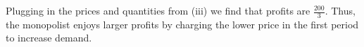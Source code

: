 \documentclass[12pt]{article}
\newcounter{question}[section]
\newenvironment{subquestions}{
  \begin{enumerate}[label=(\roman*)]}{\end{enumerate}}
\begin{document}
\begin{subquestions}
  \textcolor{solution-color}{
Plugging in the prices and quantities from (iii) we find that profits are $\frac{200}{3}$. Thus, the monopolist enjoys larger profits by charging the lower price in the first period to increase demand.
}
\end{subquestions}
\end{document}
